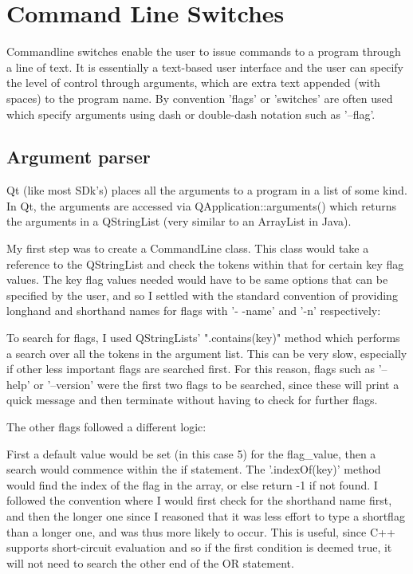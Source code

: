 \documentclass[11pt]{article} %
\begin{document}
\section{Command Line Switches}

Commandline switches enable the user to issue commands to a program through a line of text. It is essentially a text-based user interface and the user can specify the level of control through arguments, which are extra text appended (with spaces) to the program name. By convention 'flags' or 'switches' are often used which specify arguments using dash or double-dash notation such as '--flag'.

\subsection{Argument parser}

Qt (like most SDk's) places all the arguments to a program in a list of some kind. In Qt, the arguments are accessed via QApplication::arguments() which returns the arguments in a QStringList (very similar to an ArrayList in Java).

My first step was to create a CommandLine class. This class would take a reference to the QStringList and check the tokens within that for certain key flag values. The key flag values needed would have to be same options that can be specified by the user, and so I settled with the standard convention of providing longhand and shorthand names for flags with '- -name' and '-n' respectively:
\begin{frame}[fragile]

\label{frame:help}
\end{frame}

To search for flags, I used QStringLists' ".contains(key)" method which performs a search over all the tokens in the argument list. This can be very slow, especially if other less important flags are searched first. 
For this reason, flags such as '--help' or '--version' were the first two flags to be searched, since these will print a quick message and then terminate without having to check for further flags.

The other flags followed a different logic:
\begin{frame}[fragile]

\end{frame}
 First a default value would be set (in this case 5) for the flag\_value, then a search would commence within the if statement.  The '.indexOf(key)' method would find the index of the flag in the array, or else return -1 if not found. I followed the convention where I would first check for the shorthand name first, and then the longer one since I reasoned that it was less effort to type a shortflag than a longer one, and was thus more likely to occur. This is useful, since C++ supports short-circuit evaluation and so if the first condition is deemed true, it will not need to search the other end of the OR statement.
\end{document}
